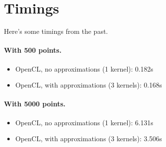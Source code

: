 \documentclass[letterpaper,10pt]{article}
\begin{document}
\section*{Timings}
Here's some timings from the past.

\paragraph{With 500 points.}
\begin{itemize}
\item    OpenCL, no approximations (1 kernel): 0.182s
\item    OpenCL, with approximations (3 kernels): 0.168s
\end{itemize}

\paragraph{With 5000 points.}
\begin{itemize}
\item    OpenCL, no approximations (1 kernel): 6.131s
\item    OpenCL, with approximations (3 kernels): 3.506s
\end{itemize}
\end{document}
